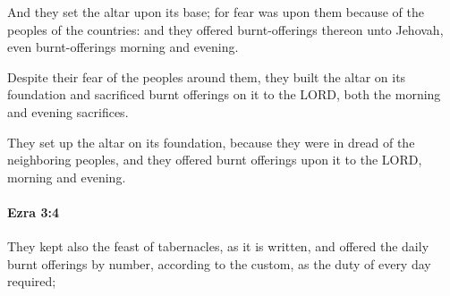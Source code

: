 			\begin{versebox}
					\item[BHS] 
					\item[LXX] 
					\item[ASV] And they set the altar upon its base; for fear was upon them because of the peoples of the countries: and they offered burnt-offerings thereon unto Jehovah, even burnt-offerings morning and evening.
					\item[NIV] Despite their fear of the peoples around them, they built the altar on its foundation and sacrificed burnt offerings on it to the LORD, both the morning and evening sacrifices.
					\item[NRSV] They set up the altar on its foundation, because they were in dread of the neighboring peoples, and they offered burnt offerings upon it to the LORD, morning and evening.
			\end{versebox}

		\paragraph{Ezra 3:4} %
			\label{EZRA-3-4}

			They kept also the feast of tabernacles, as it is written, and offered the daily burnt offerings by number, according to the custom, as the duty of every day required;

